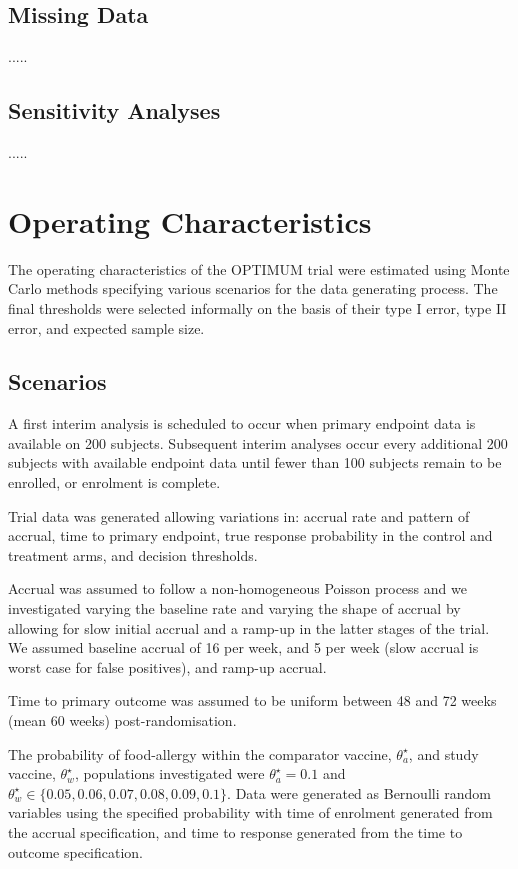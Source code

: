 \documentclass{bmcart}
\begin{document}
\subsection*{Missing Data}

.....

\subsection*{Sensitivity Analyses}

.....

\section*{Operating Characteristics}

The operating characteristics of the OPTIMUM trial were estimated using Monte Carlo methods specifying various scenarios for the data generating process. The final thresholds were selected informally on the basis of their type I error, type II error, and expected sample size.

\subsection*{Scenarios}

A first interim analysis is scheduled to occur when primary endpoint data is available on 200 subjects.
Subsequent interim analyses occur every additional 200 subjects with available endpoint data until fewer than 100 subjects remain to be enrolled, or enrolment is complete.

Trial data was generated allowing variations in: accrual rate and pattern of accrual, time to primary endpoint, true response probability in the control and treatment arms, and decision thresholds.

Accrual was assumed to follow a non-homogeneous Poisson process and we investigated varying the baseline rate and varying the shape of accrual by allowing for slow initial accrual and a ramp-up in the latter stages of the trial.
We assumed baseline accrual of 16 per week, and 5 per week (slow accrual is worst case for false positives), and ramp-up accrual.

Time to primary outcome was assumed to be uniform between 48 and 72 weeks (mean 60 weeks) post-randomisation.

The probability of food-allergy within the comparator vaccine, $\theta_a^\star$, and study vaccine, $\theta_w^\star$, populations investigated were $\theta_a^\star=0.1$ and $\theta_w^\star\in\{0.05, 0.06, 0.07, 0.08, 0.09,0.1\}$.
Data were generated as Bernoulli random variables using the specified probability with time of enrolment generated from the accrual specification, and time to response generated from the time to outcome specification.
\end{document}
